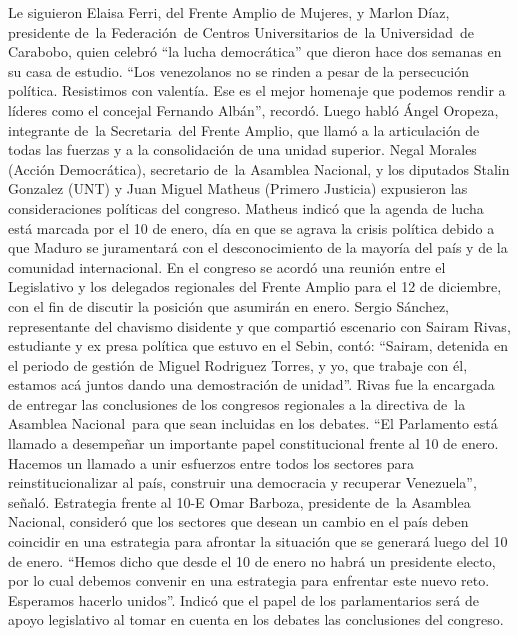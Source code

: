 \documentclass{article}%
\begin{document}
\newline%
%
Le siguieron Elaisa Ferri, del Frente Amplio de Mujeres, y Marlon Díaz, presidente de~la Federación~de Centros Universitarios de~la Universidad~de Carabobo, quien celebró “la lucha democrática” que dieron hace dos semanas en su casa de estudio.%
\newline%
%
“Los venezolanos no se rinden a pesar de la persecución política. Resistimos con valentía. Ese es el mejor homenaje que podemos rendir a líderes como el concejal Fernando Albán”, recordó.%
\newline%
%
Luego habló Ángel Oropeza, integrante de~la Secretaria~del Frente Amplio, que llamó a la articulación de todas las fuerzas y a la consolidación de una unidad superior. Negal Morales (Acción Democrática), secretario de~la Asamblea Nacional, y los diputados Stalin Gonzalez (UNT) y Juan Miguel Matheus (Primero Justicia) expusieron las consideraciones políticas del congreso.%
\newline%
%
Matheus indicó que la agenda de lucha está marcada por el 10 de enero, día en que se agrava la crisis política debido a que Maduro se juramentará con el desconocimiento de la mayoría del país y de la comunidad internacional.%
\newline%
%
En el congreso se acordó una reunión entre el Legislativo y los delegados regionales del Frente Amplio para el 12 de diciembre, con el fin de discutir la posición que asumirán en enero.%
\newline%
%
Sergio Sánchez, representante del chavismo disidente y que compartió escenario con Sairam Rivas, estudiante y ex presa política que estuvo en el Sebin, contó: “Sairam, detenida en el periodo de gestión de Miguel Rodriguez Torres, y yo, que trabaje con él, estamos acá juntos dando una demostración de unidad”.%
\newline%
%
Rivas fue la encargada de entregar las conclusiones de los congresos regionales a la directiva de~la Asamblea Nacional~para que sean incluidas en los debates. “El Parlamento está llamado a desempeñar un importante papel constitucional frente al 10 de enero. Hacemos un llamado a unir esfuerzos entre todos los sectores para reinstitucionalizar al país, construir una democracia y recuperar Venezuela”, señaló.%
\newline%
%
Estrategia frente al 10{-}E%
\newline%
%
Omar Barboza, presidente de~la Asamblea Nacional, consideró que los sectores que desean un cambio en el país deben coincidir en una estrategia para afrontar la situación que se generará luego del 10 de enero. “Hemos dicho que desde el 10 de enero no habrá un presidente electo, por lo cual debemos convenir en una estrategia para enfrentar este nuevo reto. Esperamos hacerlo unidos”. Indicó que el papel de los parlamentarios será de apoyo legislativo al tomar en cuenta en los debates las conclusiones del congreso.%
\end{document}
